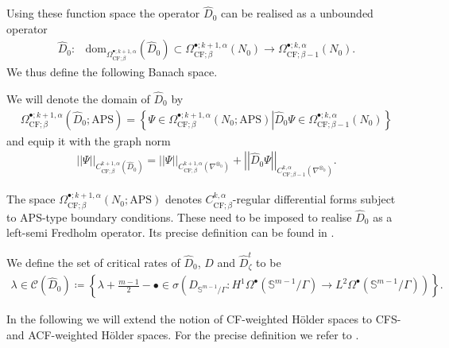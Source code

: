 \documentclass[psamsfonts]{amsart}
\theoremstyle{plain}
\theoremstyle{definition}{
\newtheorem{defi}{Definition}[section]
\newtheorem{ass}{Assumption}
\newtheorem*{nota}{Notation}}
\theoremstyle{remark}{
\newtheorem{rem}{Remark}
\newtheorem{ex}{Example}}
\theoremstyle{plain}{
\newtheorem{thm}{Theorem}[section]
\newtheorem{lem}{Lemma}[section]
\newtheorem{cor}{Corollary}[section]
\newtheorem{prop}{Proposition}[section]
\newtheorem{con}{Conjecture}[section]}
\newcommand{\m}[1]{{\mathrm{#1}}}
\begin{document}
Using these function space the operator $\widehat{D}_0$ can be realised as a unbounded operator 
\begin{align*}
    \widehat{D}_0\colon &\m{dom}_{  \Omega^{\bullet;k+1,\alpha}_{\m{CF};\beta}}(\widehat{D}_0)\subset   \Omega^{\bullet;k+1,\alpha}_{\m{CF};\beta}(N_0)\rightarrow  \Omega^{\bullet;k,\alpha}_{\m{CF};\beta-1}(N_0).
\end{align*}
We thus define the following Banach space.

\begin{defi}
We will denote the domain of $\widehat{D}_0$ by
\begin{align*}
    \Omega^{\bullet;k+1,\alpha}_{\m{CF};\beta}(\widehat{D}_0;\m{APS})=\left\{\left.\Psi\in  \Omega^{\bullet;k+1,\alpha}_{\m{CF};\beta}(N_0;\m{APS})\right|\widehat{D}_0\Psi\in   \Omega^{\bullet;k,\alpha}_{\m{CF};\beta-1}(N_0)\right\}
\end{align*}
and equip it with the graph norm 
\begin{align*}
    \left|\left|\Psi\right|\right|_{  C^{k+1,\alpha}_{\m{CF};\beta}(\widehat{D}_0)}=\left|\left|\Psi\right|\right|_{C^{k+1,\alpha}_{\m{CF};\beta}(\nabla^{\otimes_0})}+\left|\left|\widehat{D}_0\Psi\right|\right|_{C^{k,\alpha}_{\m{CF};\beta-1}(\nabla^{\otimes_0})}.
\end{align*}
\end{defi}

\begin{rem}
    The space $\Omega^{\bullet;k+1,\alpha}_{\m{CF};\beta}(N_0;\m{APS})$ denotes $C^{k,\alpha}_{\m{CF};\beta}$-regular differential forms subject to APS-type boundary conditions. These need to be imposed to realise $\widehat{D}_0$ as a left-semi Fredholm operator. Its precise definition can be found in \cite{majewskiDirac}.
\end{rem}

\begin{defi}
    We define the set of critical rates of $\widehat{D}_0$, $D$ and $\widehat{D}^t_{\zeta}$ to be
\begin{align*}
        \lambda\in\mathcal{C}(\widehat{D}_0)\coloneqq\left\{\lambda+\frac{m-1}{2}-\bullet\in\sigma\left(D_{\mathbb{S}^{m-1}/\Gamma} \colon H^1\Omega^{\bullet}(\mathbb{S}^{m-1}/\Gamma)\rightarrow L^2\Omega^{\bullet}(\mathbb{S}^{m-1}/\Gamma)\right)\right\}.
    \end{align*}
\end{defi}


In the following we will extend the notion of CF-weighted Hölder spaces to CFS- and ACF-weighted Hölder spaces. For the precise definition we refer to \cite{majewskiDirac}.\\
\end{document}
